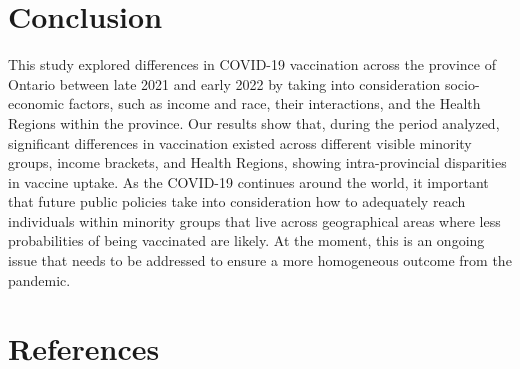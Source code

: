\documentclass[
  letterpaper,
  DIV=11,
  numbers=noendperiod]{scrartcl}
\begin{document}
\hypertarget{conclusion}{%
\section{Conclusion}\label{conclusion}}

This study explored differences in COVID-19 vaccination across the
province of Ontario between late 2021 and early 2022 by taking into
consideration socio-economic factors, such as income and race, their
interactions, and the Health Regions within the province. Our results
show that, during the period analyzed, significant differences in
vaccination existed across different visible minority groups, income
brackets, and Health Regions, showing intra-provincial disparities in
vaccine uptake. As the COVID-19 continues around the world, it important
that future public policies take into consideration how to adequately
reach individuals within minority groups that live across geographical
areas where less probabilities of being vaccinated are likely. At the
moment, this is an ongoing issue that needs to be addressed to ensure a
more homogeneous outcome from the pandemic.

\hypertarget{references}{%
\section{References}\label{references}}
\end{document}

